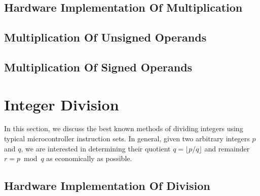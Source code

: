 \subsection{Hardware Implementation Of Multiplication}


\subsection{Multiplication Of Unsigned Operands}


\subsection{Multiplication Of Signed Operands}



\section{Integer Division}
\label{ccil0:sidv0}

In this section,
we discuss the best known methods of dividing integers using
typical microcontroller instruction sets.  In general, given
two arbitrary integers $p$ and $q$, we are interested in determining
their quotient $q=\lfloor{}p/q\rfloor$ and remainder
$r=p\bmod{}q$ as economically as possible.


\subsection{Hardware Implementation Of Division}


